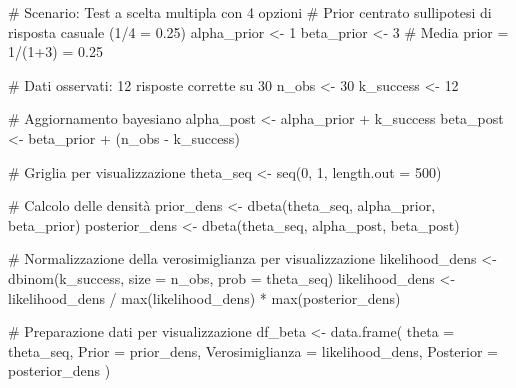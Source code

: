 \documentclass[
  letterpaper,
  DIV=11,
  numbers=noendperiod,
  oneside]{scrreprt}
\newenvironment{Shaded}{\begin{snugshade}}{\end{snugshade}}
\newcommand{\AttributeTok}[1]{\textcolor[rgb]{0.40,0.45,0.13}{#1}}
\newcommand{\CommentTok}[1]{\textcolor[rgb]{0.37,0.37,0.37}{#1}}
\newcommand{\DecValTok}[1]{\textcolor[rgb]{0.68,0.00,0.00}{#1}}
\newcommand{\FunctionTok}[1]{\textcolor[rgb]{0.28,0.35,0.67}{#1}}
\newcommand{\NormalTok}[1]{\textcolor[rgb]{0.00,0.23,0.31}{#1}}
\newcommand{\OtherTok}[1]{\textcolor[rgb]{0.00,0.23,0.31}{#1}}
\newcommand{\SpecialCharTok}[1]{\textcolor[rgb]{0.37,0.37,0.37}{#1}}
\theoremstyle{definition}
\theoremstyle{plain}
\theoremstyle{definition}
\theoremstyle{remark}
\begin{document}
\begin{Shaded}
\begin{Highlighting}[]
\CommentTok{\# Scenario: Test a scelta multipla con 4 opzioni}
\CommentTok{\# Prior centrato sull\textquotesingle{}ipotesi di risposta casuale (1/4 = 0.25)}
\NormalTok{alpha\_prior }\OtherTok{\textless{}{-}} \DecValTok{1}
\NormalTok{beta\_prior }\OtherTok{\textless{}{-}} \DecValTok{3}  \CommentTok{\# Media prior = 1/(1+3) = 0.25}

\CommentTok{\# Dati osservati: 12 risposte corrette su 30}
\NormalTok{n\_obs }\OtherTok{\textless{}{-}} \DecValTok{30}
\NormalTok{k\_success }\OtherTok{\textless{}{-}} \DecValTok{12}

\CommentTok{\# Aggiornamento bayesiano}
\NormalTok{alpha\_post }\OtherTok{\textless{}{-}}\NormalTok{ alpha\_prior }\SpecialCharTok{+}\NormalTok{ k\_success}
\NormalTok{beta\_post }\OtherTok{\textless{}{-}}\NormalTok{ beta\_prior }\SpecialCharTok{+}\NormalTok{ (n\_obs }\SpecialCharTok{{-}}\NormalTok{ k\_success)}

\CommentTok{\# Griglia per visualizzazione}
\NormalTok{theta\_seq }\OtherTok{\textless{}{-}} \FunctionTok{seq}\NormalTok{(}\DecValTok{0}\NormalTok{, }\DecValTok{1}\NormalTok{, }\AttributeTok{length.out =} \DecValTok{500}\NormalTok{)}

\CommentTok{\# Calcolo delle densità}
\NormalTok{prior\_dens }\OtherTok{\textless{}{-}} \FunctionTok{dbeta}\NormalTok{(theta\_seq, alpha\_prior, beta\_prior)}
\NormalTok{posterior\_dens }\OtherTok{\textless{}{-}} \FunctionTok{dbeta}\NormalTok{(theta\_seq, alpha\_post, beta\_post)}

\CommentTok{\# Normalizzazione della verosimiglianza per visualizzazione}
\NormalTok{likelihood\_dens }\OtherTok{\textless{}{-}} \FunctionTok{dbinom}\NormalTok{(k\_success, }\AttributeTok{size =}\NormalTok{ n\_obs, }\AttributeTok{prob =}\NormalTok{ theta\_seq)}
\NormalTok{likelihood\_dens }\OtherTok{\textless{}{-}}\NormalTok{ likelihood\_dens }\SpecialCharTok{/} \FunctionTok{max}\NormalTok{(likelihood\_dens) }\SpecialCharTok{*} \FunctionTok{max}\NormalTok{(posterior\_dens)}

\CommentTok{\# Preparazione dati per visualizzazione}
\NormalTok{df\_beta }\OtherTok{\textless{}{-}} \FunctionTok{data.frame}\NormalTok{(}
  \AttributeTok{theta =}\NormalTok{ theta\_seq,}
  \AttributeTok{Prior =}\NormalTok{ prior\_dens,}
  \AttributeTok{Verosimiglianza =}\NormalTok{ likelihood\_dens,}
  \AttributeTok{Posterior =}\NormalTok{ posterior\_dens}
\NormalTok{)}


\end{Highlighting}
\end{Shaded}
\end{document}
